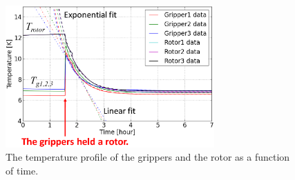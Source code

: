 \documentclass[journal]{IEEEtran}
\begin{document}
\begin{figure}[htb]
   \centering
   \includegraphics[width=80mm]{TemperatureEstimate_rev.eps} %
   \caption{The temperature profile of the grippers and the rotor as a function of time. }
   \label{fig:TemperatureEstimate}
\end{figure}
\end{document}
